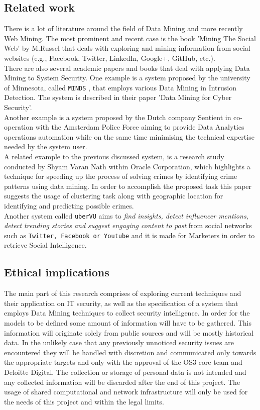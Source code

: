 \documentclass[12pt]{article}
\begin{document}
\subsection{Related work}
There is a lot of literature around the field of Data Mining and more recently Web Mining. The most prominent and recent case is the book 'Mining The Social Web' by M.Russel \cite{socialweb} that deals with exploring and mining information from social websites (e.g., Facebook, Twitter, LinkedIn, Google+, GitHub, etc.). 
\hfill \break \\
There are also several academic papers and books that deal with applying Data Mining to System Security. One example is a system proposed by the university of Minnesota, called \texttt{MINDS}  \cite{minds}, that employs various Data Mining in Intrusion Detection. The system is described in their paper 'Data Mining for Cyber Security'. 
\hfill \break \\
Another example is a system proposed by the Dutch company Sentient in co-operation with the Amsterdam Police Force \cite{police} aiming to provide Data Analytics operations automation while on the same time minimising the technical expertise needed by the system user.
\hfill \break \\
A related example to the previous discussed system, is a research study conducted by Shyam Varan Nath within Oracle Corporation, which highlights a technique for speeding up the process of solving crimes \cite{pattern-police} by identifying crime patterns using data mining. In order to accomplish the proposed task this paper suggests the usage of clustering task  along with geographic location for identifying and predicting possible crimes. 
\hfill \break \\
Another  system called \texttt{uberVU} \cite{ubervu} aims to \textit{find insights, detect influencer mentions, detect trending stories and suggest engaging content to post} from social networks such as \texttt{Twitter, Facebook or Youtube} and it is made for Marketers in order to retrieve Social Intelligence.  
\newpage
\subsection{Ethical implications}

The main part of this research comprises of exploring current techniques and their application on IT security, as well as the specification of a system that employs Data Mining techniques to collect security intelligence. In order for the models to be defined some amount of information will have to be gathered. This information will originate solely from public sources and will be mostly historical data. In the unlikely case that any previously unnoticed security issues are encountered they will be handled with discretion and communicated only towards the appropriate targets and only with the approval of the OS3 core team and Deloitte Digital. The collection or storage of personal data is not intended and any collected information will be discarded after the end of this project. The usage of shared computational and network infrastructure will only be used for the needs of this project and within the legal limits.
\end{document}
